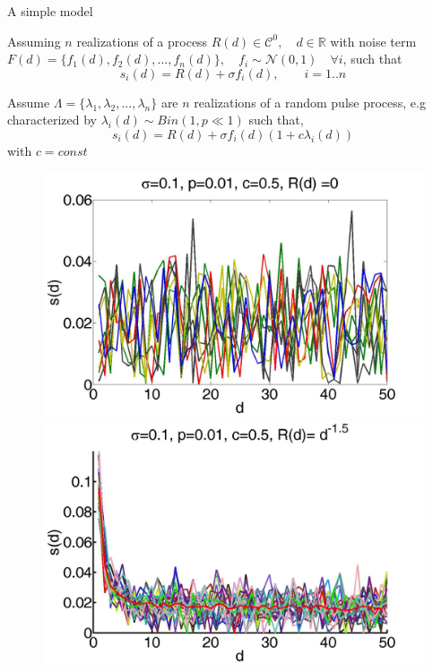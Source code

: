 \documentclass[8pt]{beamer}
\begin{document}
\begin{frame}{A simple model}

 Assuming $n$ realizations of a process $R(d)\in \mathcal{C}^0,\quad d\in\mathbb{R}$ with noise term $F(d)=\{f_1(d),f_2(d),...,f_n(d)\}, \quad f_i\sim \mathcal{N}(0,1)\quad \forall i$, such that 
 \begin{equation*}
 s_i(d) = R(d)+\sigma f_i(d),\qquad i=1..n
 \end{equation*}
 
 Assume $\Lambda=\{\lambda_1,\lambda_2,...,\lambda_n\}$ are $n$ realizations of a random pulse process, e.g characterized by $\lambda_i(d)\sim Bin(1,p\ll1)$ such that, 
 \begin{equation*}
 s_i(d)=R(d)+\sigma f_i(d)(1+c\lambda_i(d))
 \end{equation*}
  with $c=const$
\begin{figure}[H]
\includegraphics[scale=0.08]{randSignalSample}
\includegraphics[scale=0.08]{gaussianChainSignalSample}

\end{figure}
\end{frame}
\end{document}
